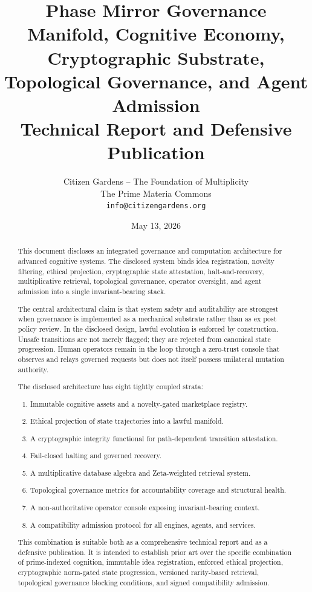 \documentclass[11pt]{article}
\title{Phase Mirror Governance Manifold, Cognitive Economy, Cryptographic Substrate,\\ Topological Governance, and Agent Admission\\ \large Technical Report and Defensive Publication}
\author{Citizen Gardens -- The Foundation of Multiplicity\\
The Prime Materia Commons\\
\texttt{info@citizengardens.org}}
\date{May 13, 2026}
\begin{document}
\maketitle

\begin{abstract}
This document discloses an integrated governance and computation architecture for advanced cognitive systems. The disclosed system binds idea registration, novelty filtering, ethical projection, cryptographic state attestation, halt-and-recovery, multiplicative retrieval, topological governance, operator oversight, and agent admission into a single invariant-bearing stack.

The central architectural claim is that system safety and auditability are strongest when governance is implemented as a mechanical substrate rather than as ex post policy review. In the disclosed design, lawful evolution is enforced by construction. Unsafe transitions are not merely flagged; they are rejected from canonical state progression. Human operators remain in the loop through a zero-trust console that observes and relays governed requests but does not itself possess unilateral mutation authority.

The disclosed architecture has eight tightly coupled strata:
\begin{enumerate}[leftmargin=1.4cm]
  \item Immutable cognitive assets and a novelty-gated marketplace registry.
  \item Ethical projection of state trajectories into a lawful manifold.
  \item A cryptographic integrity functional for path-dependent transition attestation.
  \item Fail-closed halting and governed recovery.
  \item A multiplicative database algebra and Zeta-weighted retrieval system.
  \item Topological governance metrics for accountability coverage and structural health.
  \item A non-authoritative operator console exposing invariant-bearing context.
  \item A compatibility admission protocol for all engines, agents, and services.
\end{enumerate}

This combination is suitable both as a comprehensive technical report and as a defensive publication. It is intended to establish prior art over the specific combination of prime-indexed cognition, immutable idea registration, enforced ethical projection, cryptographic norm-gated state progression, versioned rarity-based retrieval, topological governance blocking conditions, and signed compatibility admission.
\end{abstract}
\end{document}
